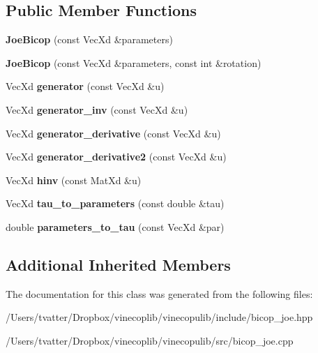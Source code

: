 \subsection*{Public Member Functions}
\begin{DoxyCompactItemize}
\item 
\mbox{\label{class_joe_bicop_a15feadcf7028ba91c041c05f7033289d}} 
{\bfseries Joe\+Bicop} (const Vec\+Xd \&parameters)
\item 
\mbox{\label{class_joe_bicop_aae0e184fda31ed3a78520f70d4f4102e}} 
{\bfseries Joe\+Bicop} (const Vec\+Xd \&parameters, const int \&rotation)
\item 
\mbox{\label{class_joe_bicop_a3a9cd4684de97041f271ce1f40c32fa2}} 
Vec\+Xd {\bfseries generator} (const Vec\+Xd \&u)
\item 
\mbox{\label{class_joe_bicop_ad4d4ff3ee52eac61b526f10a8b12c400}} 
Vec\+Xd {\bfseries generator\+\_\+inv} (const Vec\+Xd \&u)
\item 
\mbox{\label{class_joe_bicop_a9ee3b11b81ae825369fc1a82f922d480}} 
Vec\+Xd {\bfseries generator\+\_\+derivative} (const Vec\+Xd \&u)
\item 
\mbox{\label{class_joe_bicop_a7613e4c3cd33efac94cf2d1ee7b9869d}} 
Vec\+Xd {\bfseries generator\+\_\+derivative2} (const Vec\+Xd \&u)
\item 
\mbox{\label{class_joe_bicop_a40102f50e0cd111ad75a46acdfbd80ac}} 
Vec\+Xd {\bfseries hinv} (const Mat\+Xd \&u)
\item 
\mbox{\label{class_joe_bicop_a213002b8d12025e0aa4a3e8d648a05d1}} 
Vec\+Xd {\bfseries tau\+\_\+to\+\_\+parameters} (const double \&tau)
\item 
\mbox{\label{class_joe_bicop_adbb7cf686a892146ea2a963e781593eb}} 
double {\bfseries parameters\+\_\+to\+\_\+tau} (const Vec\+Xd \&par)
\end{DoxyCompactItemize}
\subsection*{Additional Inherited Members}


The documentation for this class was generated from the following files\+:\begin{DoxyCompactItemize}
\item 
/\+Users/tvatter/\+Dropbox/vinecoplib/vinecopulib/include/bicop\+\_\+joe.\+hpp\item 
/\+Users/tvatter/\+Dropbox/vinecoplib/vinecopulib/src/bicop\+\_\+joe.\+cpp\end{DoxyCompactItemize}
